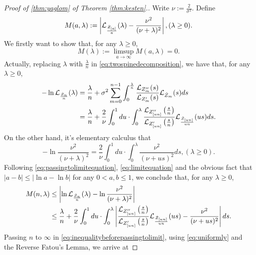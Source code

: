 \documentclass[12pt]{amsart}
\theoremstyle{remark}
\numberwithin{equation}{section}
\newcommand{\abs}[1]{\left| #1 \right|}
\newcommand{\expr}[1]{\left( #1 \right)}
\begin{document}
\begin{proof}[Proof of \eqref{thm:yaglom} of Theorem \ref{thm:kesten}.]
	Write $\nu:=\frac{2}{\sigma^2}$. Define
\begin{equation}
		M(a,\lambda)
	:=
		\abs{\cL_{\frac{\dot Z_{[a]}}{a}}(\lambda)-\frac{\nu^2}{(\nu+\lambda)^2}}
	,(\lambda \geq 0).
\end{equation}
	We firstly want to show that, for any $\lambda\geq 0$,
\begin{equation}
\label{eq:Miszerofunction}
		M(\lambda)
	:=
		\limsup_{a\to\infty}M(a,\lambda)
	=
		0.
\end{equation}
	Actually, replacing $\lambda$ with $\frac{\lambda}{n}$ in \eqref{eq:twospinedecomposition}, we have that, for any $\lambda\geq 0$,
\begin{equation}
\label{eq:passingtolimitequation}
\begin{split}
		-\ln \cL_{\frac{\dot Z_n}{n}}(\lambda)
	&=
		\frac{\lambda}{n}+\sigma^2\sum_{m=0}^{n-1}\int_0^{\frac{\lambda}{n}} \frac{\cL_{Z''_m}(s)}{\cL_{Z'_m}(s)}\cL_{\dot Z_{m}}(s)ds
	\\&=
		\frac{\lambda}{n}+\frac{2}{\nu}\int_0^1 du \cdot \int_0^{\lambda} \frac{\cL_{Z''_{[un]}}\expr{\frac{s}{n}}}{\cL_{Z'_{[un]}}\expr{\frac{s}{n}}}\cL_{\frac{\dot Z_{[un]}}{un}}(us)ds.
\end{split}
\end{equation}
	On the other hand, it's elementary calculus that
\begin{equation}
\label{eq:limitequation}
        -\ln\frac{\nu^2}{(\nu+\lambda)^2}
    =
		\frac{2}{\nu}\int_0^1du\cdot\int_0^\lambda \frac{\nu^2}{(\nu+us)^2}ds,
	(\lambda\geq 0).
\end{equation}
	Following \eqref{eq:passingtolimitequation}, \eqref{eq:limitequation} and the obvious fact that $\abs{a-b}\leq\abs{\ln a-\ln b}$ for any $0<a,b\leq 1$, we conclude that, for any $\lambda\geq 0$,
\begin{equation}
\label{eq:inequalitybeforepassingtolimit}
\begin{split}
        M(n,\lambda)
    &\leq
		\abs{\ln \cL_{\frac{\dot Z_n}{n}}(\lambda)-\ln\frac{\nu^2}{(\nu+\lambda)^2}}
	\\&\leq
		\frac{\lambda}{n}
	+
	    \frac{2}{\nu}\int_0^1 du
	\cdot 
	    \int_0^{\lambda} \abs{\frac{\cL_{Z''_{[un]}}\expr{\frac{s}{n}}}{\cL_{Z'_{[un]}}\expr{\frac{s}{n}}}\cL_{\frac{\dot Z_{[un]}}{un}}(us)- \frac{\nu^2}{(\nu+us)^2}}ds.
\end{split}
\end{equation}
    Passing $n$ to $\infty$ in \eqref{eq:inequalitybeforepassingtolimit}, using \eqref{eq:uniformly} and the Reverse Fatou's Lemma, we arrive at

\end{proof}
\end{document}
